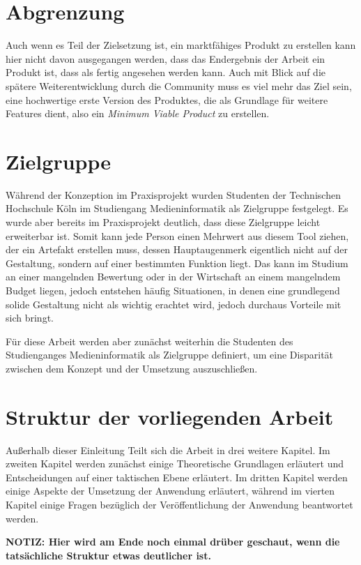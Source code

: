 \section{Abgrenzung}
Auch wenn es Teil der Zielsetzung ist, ein marktfähiges Produkt zu erstellen kann hier nicht davon ausgegangen werden, dass das Endergebnis der Arbeit ein Produkt ist, dass als fertig angesehen werden kann. Auch mit Blick auf die spätere Weiterentwicklung durch die Community muss es viel mehr das Ziel sein, eine hochwertige erste Version des Produktes, die als Grundlage für weitere Features dient, also ein \textit{Minimum Viable Product} zu erstellen.

\section{Zielgruppe}
Während der Konzeption im Praxisprojekt wurden Studenten der Technischen Hochschule Köln im Studiengang Medieninformatik als Zielgruppe festgelegt. Es wurde aber bereits im Praxisprojekt deutlich, dass diese Zielgruppe leicht erweiterbar ist. Somit kann jede Person einen Mehrwert aus diesem Tool ziehen, der ein Artefakt erstellen muss, dessen Hauptaugenmerk eigentlich nicht auf der Gestaltung, sondern auf einer bestimmten Funktion liegt. Das kann im Studium an einer mangelnden Bewertung oder in der Wirtschaft an einem mangelndem Budget liegen, jedoch entstehen häufig Situationen, in denen eine grundlegend solide Gestaltung nicht als wichtig erachtet wird, jedoch durchaus Vorteile mit sich bringt.

Für diese Arbeit werden aber zunächst weiterhin die Studenten des Studienganges Medieninformatik als Zielgruppe definiert, um eine Disparität zwischen dem Konzept und der Umsetzung auszuschließen.

\section{Struktur der vorliegenden Arbeit}
Außerhalb dieser Einleitung Teilt sich die Arbeit in drei weitere Kapitel. Im zweiten Kapitel werden zunächst einige Theoretische Grundlagen erläutert und Entscheidungen auf einer taktischen Ebene erläutert. Im dritten Kapitel werden einige Aspekte der Umsetzung der Anwendung erläutert, während im vierten Kapitel einige Fragen bezüglich der Veröffentlichung der Anwendung beantwortet werden.

\textbf{NOTIZ: Hier wird am Ende noch einmal drüber geschaut, wenn die tatsächliche Struktur etwas deutlicher ist.}
